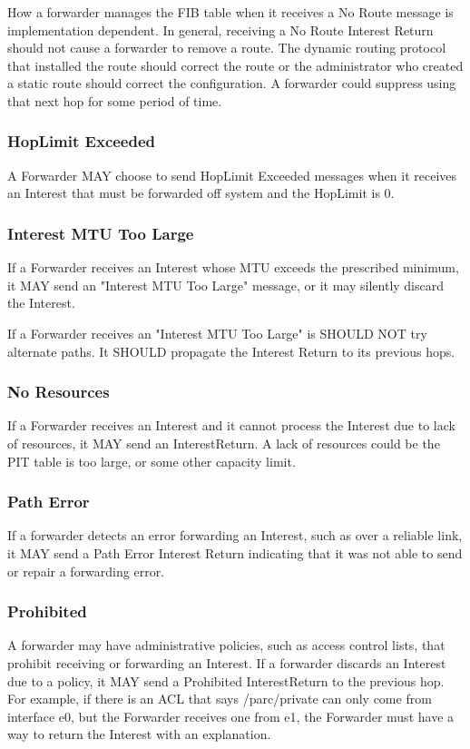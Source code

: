 \documentclass[12pt]{article}
\begin{document}
How a forwarder manages the FIB table when it receives a No Route
message is implementation dependent.  In general, receiving a No
Route Interest Return should not cause a forwarder to remove a route.
The dynamic routing protocol that installed the route should correct
the route or the administrator who created a static route should
correct the configuration.  A forwarder could suppress using that
next hop for some period of time.

\subsubsection{HopLimit Exceeded}
A Forwarder MAY choose to send HopLimit Exceeded messages when it
receives an Interest that must be forwarded off system and the
HopLimit is 0.

\subsubsection{Interest MTU Too Large}
If a Forwarder receives an Interest whose MTU exceeds the prescribed
minimum, it MAY send an "Interest MTU Too Large" message, or it may
silently discard the Interest.

If a Forwarder receives an "Interest MTU Too Large" is SHOULD NOT try
alternate paths. It SHOULD propagate the Interest Return to its
previous hops.

\subsubsection{No Resources}
If a Forwarder receives an Interest and it cannot process the
Interest due to lack of resources, it MAY send an InterestReturn. A
lack of resources could be the PIT table is too large, or some other
capacity limit.

\subsubsection{Path Error}
If a forwarder detects an error forwarding an Interest, such as over
a reliable link, it MAY send a Path Error Interest Return indicating
that it was not able to send or repair a forwarding error.

\subsubsection{Prohibited}
A forwarder may have administrative policies, such as access control
lists, that prohibit receiving or forwarding an Interest.  If a
forwarder discards an Interest due to a policy, it MAY send a
Prohibited InterestReturn to the previous hop.  For example, if there
is an ACL that says /parc/private can only come from interface e0,
but the Forwarder receives one from e1, the Forwarder must have a way
to return the Interest with an explanation.
\end{document}
